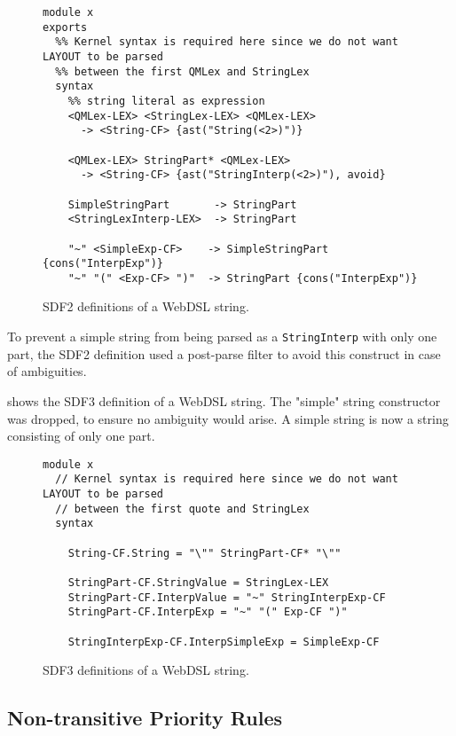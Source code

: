       \begin{figure}
        \begin{verbatim}
module x
exports
  %% Kernel syntax is required here since we do not want LAYOUT to be parsed
  %% between the first QMLex and StringLex
  syntax
    %% string literal as expression
    <QMLex-LEX> <StringLex-LEX> <QMLex-LEX>
      -> <String-CF> {ast("String(<2>)")}

    <QMLex-LEX> StringPart* <QMLex-LEX>
      -> <String-CF> {ast("StringInterp(<2>)"), avoid}

    SimpleStringPart       -> StringPart
    <StringLexInterp-LEX>  -> StringPart

    "~" <SimpleExp-CF>    -> SimpleStringPart {cons("InterpExp")}
    "~" "(" <Exp-CF> ")"  -> StringPart {cons("InterpExp")}
        \end{verbatim}
        \caption{\label{fig:sdf2-webdsl-string}SDF2 definitions of a WebDSL string.}
      \end{figure}

      To prevent a simple string from being parsed as a \texttt{StringInterp} with only one part, the SDF2 definition used a post-parse filter to avoid this construct in case of ambiguities.
      
       shows the SDF3 definition of a WebDSL string. The "simple" string constructor was dropped, to ensure no ambiguity would arise. A simple string is now a string consisting of only one part.

      \begin{figure}
        \begin{verbatim}
module x
  // Kernel syntax is required here since we do not want LAYOUT to be parsed
  // between the first quote and StringLex
  syntax

    String-CF.String = "\"" StringPart-CF* "\""

    StringPart-CF.StringValue = StringLex-LEX
    StringPart-CF.InterpValue = "~" StringInterpExp-CF
    StringPart-CF.InterpExp = "~" "(" Exp-CF ")"

    StringInterpExp-CF.InterpSimpleExp = SimpleExp-CF
        \end{verbatim}
        \caption{\label{fig:sdf3-webdsl-string}SDF3 definitions of a WebDSL string.}
      \end{figure}

    \subsection{Non-transitive Priority Rules}

